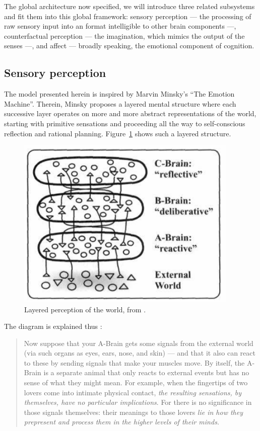 The global architecture now specified, we will introduce three related subsystems and fit them into this global framework: sensory perception --- the processing of raw sensory input into an format intelligible to other brain components ---, counterfactual perception --- the imagination, which mimics the output of the senses ---, and affect --- broadly speaking, the emotional component of cognition.

\subsection{Sensory perception}\label{sec:sensoryPerception}

The model presented herein is inspired by Marvin Minsky's ``The Emotion Machine''. Therein, Minsky proposes a layered mental structure where each successive layer operates on more and more abstract representations of the world, starting with primitive sensations and proceeding all the way to self-conscious reflection and rational planning. Figure~\ref{fig:brainLayers} shows such a layered structure.

 \begin{figure}[!h]
 	\centering
 	\includegraphics[width=300pt]{figs/emotionMachine_brainLayers.png}
 	\caption{Layered perception of the world, from \cite[p. 100]{emotionMachine}.}
 	\label{fig:brainLayers}
 \end{figure}
 
 \newpage
 
The diagram is explained thus \cite[p. 100]{emotionMachine}:

\begin{quote}
	Now suppose that your A-Brain gets some signals from the external world (via such organs as eyes, ears, nose, and skin) --- and that it also can react to these by sending signals that make your muscles move. By itself, the A-Brain is a separate animal that only reacts to external events but has no sense of what they might mean. For example, when the fingertips of two lovers come into intimate physical contact, {\em the resulting sensations, by themselves, have no particular implications}. For there is no significance in those signals themselves: their meanings to those lovers {\em lie in how they prepresent and process them in the higher levels of their minds.}
\end{quote}

